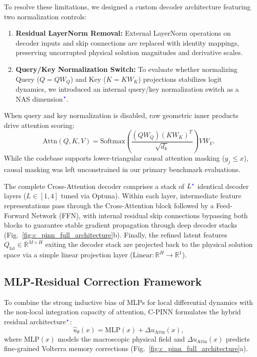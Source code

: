 To resolve these limitations, we designed a custom decoder architecture featuring two normalization controls:
\begin{enumerate}
    \item \textbf{Residual LayerNorm Removal:} External LayerNorm operations on decoder inputs and skip connections are replaced with identity mappings, preserving uncorrupted physical solution magnitudes and derivative scales.
    \item \textbf{Query/Key Normalization Switch:} To evaluate whether normalizing Query ($Q = Q W_Q$) and Key ($K = K W_K$) projections stabilizes logit dynamics, we introduced an internal query/key normalization switch as a NAS dimension$^{\textcolor{blue}{\star}}$.
\end{enumerate}

When query and key normalization is disabled, raw geometric inner products drive attention scoring:
\begin{equation}
    \text{Attn}(Q, K, V) = \text{Softmax}\left(\frac{(Q W_Q) (K W_K)^T}{\sqrt{d_k}}\right) V W_V.
    \label{eq:linnorm_attn}
\end{equation}
While the codebase supports lower-triangular causal attention masking ($y_j \le x$), causal masking was left unconstrained in our primary benchmark evaluations.

The complete Cross-Attention decoder comprises a stack of $L^{\textcolor{blue}{\star}}$ identical decoder layers ($L \in [1, 4]$ tuned via Optuna). Within each layer, intermediate feature representations pass through the Cross-Attention block followed by a Feed-Forward Network (FFN), with internal residual skip connections bypassing both blocks to guarantee stable gradient propagation through deep decoder stacks (Fig.~\ref{fig:c_pinn_full_architecture}b). Finally, the refined latent features $Q_{\text{lat}} \in \mathbb{R}^{M \times H}$ exiting the decoder stack are projected back to the physical solution space via a simple linear projection layer ($\text{Linear}: \mathbb{R}^H \to \mathbb{R}^1$).

\subsection{MLP-Residual Correction Framework}
To combine the strong inductive bias of MLPs for local differential dynamics with the non-local integration capacity of attention, C-PINN formulates the hybrid residual architecture$^{\textcolor{blue}{\star}}$:
\begin{equation}
    \hat{u}_\theta(x) = \text{MLP}(x) + \Delta u_{\text{Attn}}(x),
\end{equation}
where $\text{MLP}(x)$ models the macroscopic physical field and $\Delta u_{\text{Attn}}(x)$ predicts fine-grained Volterra memory corrections (Fig.~\ref{fig:c_pinn_full_architecture}a).

